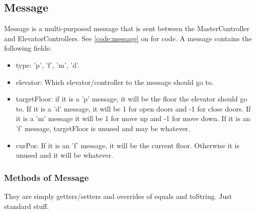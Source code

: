 \subsection{Message}
Message is a multi-purposed message that is sent between the MasterController and ElevatorControllers. See \cref{code:message} on  for code.\newline
A message contains the following fields:
\begin{itemize}
\item type: 'p', 'f', 'm', 'd'.
\item elevator: Which elevator/controller to the message should go to.
\item targetFloor: if it is a 'p' message, it will be the floor the elevator should go to. If it is a 'd' message, it will be 1 for open doors and -1 for close doors. If it is a 'm' message it will be 1 for move up and -1 for move down. If it is an 'f' message, targetFloor is unused and may be whatever.
\item curPos: If it is an 'f' message, it will be the current floor. Otherwise it is unused and it will be whatever.
\end{itemize}

\subsubsection{Methods of Message}
They are simply getters/setters and overrides of equals and toString. Just standard stuff.